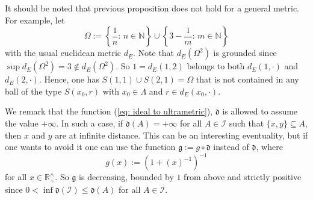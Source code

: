 \documentclass[11pt,british,reqno]{article}
\numberwithin{equation}{section}
\numberwithin{figure}{section}
\numberwithin{table}{section}
\theoremstyle{definition}
\theoremstyle{definition}
\theoremstyle{plain}
\theoremstyle{plain}
\theoremstyle{remark}
\theoremstyle{plain}
\numberwithin{equation}{section}
\numberwithin{figure}{section}
\numberwithin{table}{section}
\theoremstyle{plain}
\begin{document}
It should be noted that previous proposition does not hold for a general metric. For example, let 
\begin{equation}
\Omega:={\displaystyle \left\{ \frac{1}{n}:\,n\in\mathbb{N}\right\} }\cup \left\{ 3-\frac{1}{m}:\,m\in\mathbb{N}\right\}
\label{eq: no-example general metric}
\end{equation}
with the usual euclidean metric $d_{E}$. Note that $d_{E}(\Omega^{2})$ is grounded since $\sup d_{E}(\Omega^{2})=3\notin d_{E}(\Omega^{2})$. So $1=d_{E}(1,2)$ belongs to both $d_{E}(1,\cdot)$ and $d_{E}(2,\cdot)$. Hence, one has $S\left(1,1\right)\cup S\left(2,1\right)=\Omega$ that is not contained in any ball of the type $S(x_{0},r)$ with $x_{0}\in\Lambda$ and $r\in d_{E}(x_{0},\cdot)$. 

We remark that the function (\ref{eq: ideal to ultrametric}),
$\mathfrak{d}$ is allowed to assume the value $+\infty$. In such
a case, if $\mathfrak{d}(A)=+\infty$ for all $A\in\mathcal{I}$ such
that $\{x,y\}\subseteq A$, then $x$ and $y$ are at infinite distance.
This can be an interesting eventuality, but if one wants to avoid
it one can use the function $\mathfrak{g}:=g\circ\mathfrak{d}$ instead
of $\mathfrak{d}$, where 
\begin{equation}
g(x):=\left(1+(x)^{-1}\right)^{-1}
\label{eq: deinfinitation}
\end{equation} for
all $x\in\mathbb{R}_{+}^{\wedge}$. So $\mathfrak{g}$ is decreasing,
bounded by $1$ from above and strictly positive since $0<\inf\mathfrak{d}(\mathcal{I})\leq\mathfrak{d}(A)$
for all $A\in\mathcal{I}$.  
\end{document}
